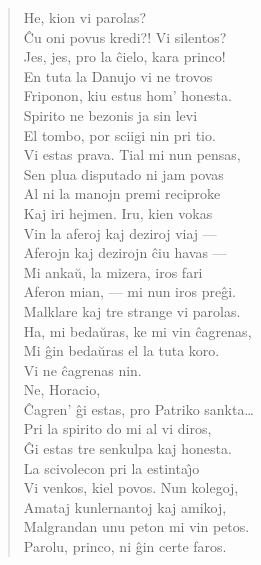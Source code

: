 \begin{verse}
  He, kion vi parolas?\\
                \^Cu oni povus kredi?! Vi silentos?\\
 Jes, jes, pro la \^cielo, kara princo!\\
 En tuta la Danujo vi ne trovos\\
                Friponon, kiu estus hom' honesta.\\
 Spirito ne bezonis ja sin levi\\
                El tombo, por sciigi nin pri tio.\\
 Vi estas prava. Tial mi nun pensas,\\
                Sen plua disputado ni jam povas\\
                Al ni la manojn premi reciproke\\
                Kaj iri hejmen. Iru, kien vokas\\
                Vin la aferoj kaj deziroj viaj ---\\
                Aferojn kaj dezirojn \^ciu havas ---\\
                Mi anka\u u, la mizera, iros fari\\
                Aferon mian, --- mi nun iros pre\^gi.\\
 Malklare kaj tre strange vi parolas.\\
 Ha, mi beda\u uras, ke mi vin \^cagrenas,\\
                Mi \^gin beda\u uras el la tuta koro.\\
 Vi ne \^cagrenas nin.\\
  Ne, Horacio,\\
                \^Cagren' \^gi estas, pro Patriko sankta\dots\\
                Pri la spirito do mi al vi diros,\\
                \^Gi estas tre senkulpa kaj honesta.\\
                La scivolecon pri la estinta\^{\j}o\\
                Vi venkos, kiel povos. Nun kolegoj,\\
                Amataj kunlernantoj kaj amikoj,\\
                Malgrandan unu peton mi vin petos.\\
 Parolu, princo, ni \^gin certe faros.\\

\end{verse}

